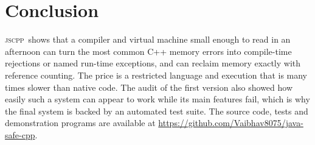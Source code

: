 \documentclass[conference]{IEEEtran}
\newcommand{\jscpp}{\textsc{jscpp}}
\begin{document}
\section{Conclusion}
\jscpp\ shows that a compiler and virtual machine small enough to read in an afternoon can turn the most common
C++ memory errors into compile-time rejections or named run-time exceptions, and can reclaim memory exactly with
reference counting. The price is a restricted language and execution that is many times slower than native code.
The audit of the first version also showed how easily such a system can appear to work while its main features
fail, which is why the final system is backed by an automated test suite. The source code, tests and demonstration
programs are available at \url{https://github.com/Vaibhav8075/java-safe-cpp}.



\end{document}
